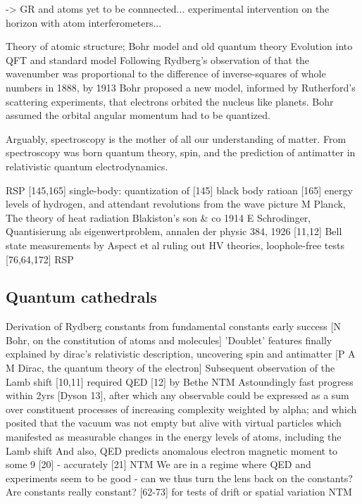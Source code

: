 	-> GR and atoms yet to be connnected... experimental intervention on the horizon with atom interferometers...



	Theory of atomic structure; Bohr model and old quantum theory
	Evolution into QFT and standard model
	Following Rydberg's observation of that the wavenumber was proportional to the difference of inverse-squares of whole numbers in 1888, by 1913 Bohr proposed a new model, informed by Rutherford's scattering experiments, that electrons orbited the nucleus like planets.
			Bohr assumed the orbital angular momentum had to be quantized.

	Arguably, spectroscopy is the mother of all our understanding of matter. From spectroscopy was born quantum theory, spin, and the prediction of antimatter in relativistic quantum electrodynamics.


	RSP [145,165] single-body: quantization of [145] black body ratioan [165] energy levels of hydrogen, and attendant revolutions from the wave picture  
	M Planck, The theory of heat radiation Blakiston's son \& co 1914
	E Schrodinger, Quantisierung als eigenwertproblem, annalen der physic 384, 1926
	[11,12] Bell state measurements by Aspect et al ruling out HV theories, loophole-free tests [76,64,172] RSP
	
\subsection*{Quantum cathedrals}

	Derivation of Rydberg constants from fundamental constants early success [N Bohr, on the constitution of atoms and molecules] 
	'Doublet' features finally explained by dirac's relativistic description, uncovering spin and antimatter [P A M Dirac, the quantum theory of the electron]
	Subsequent observation of the Lamb shift [10,11] required QED [12] by Bethe  NTM
	Astoundingly fast progress within 2yrs [Dyson 13], after which any observable could be expressed as a sum over constituent processes of increasing complexity weighted by alpha; and which posited that the vacuum was not empty but alive with virtual particles which manifested as measurable changes in the energy levels of atoms, including the Lamb shift
	And also, QED predicts anomalous electron magnetic moment to some 9 [20] - accurately [21] NTM
	We are in a regime where QED and experiments seem to be good - can we thus turn the lens back on the constants?	
	Are constants really constant? [62-73] for tests of drift or spatial variation  NTM

